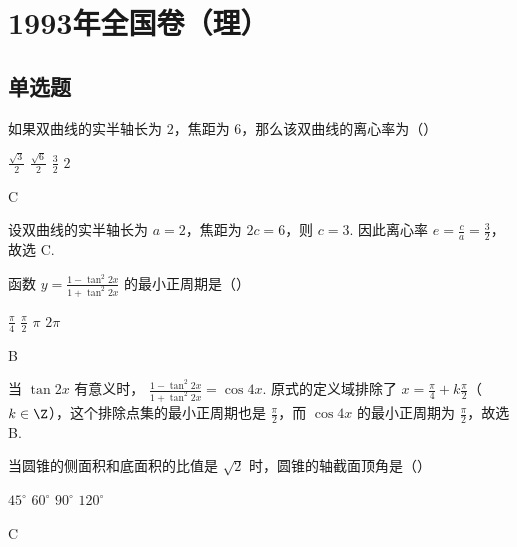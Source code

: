 \chapter{1993年全国卷（理）}
\section{单选题}

\begin{problem}
如果双曲线的实半轴长为 \(2\)，焦距为 \(6\)，那么该双曲线的离心率为（\quad）

\choices
    {\(\frac{\sqrt{3}}{2}\)}
    {\(\frac{\sqrt{6}}{2}\)}
    {\(\frac{3}{2}\)}
    {\(2\)}
\end{problem}

\begin{answer}
C
\end{answer}

\begin{solution}
设双曲线的实半轴长为 \(a=2\)，焦距为 \(2c=6\)，则 \(c=3\). 因此离心率
\(e=\frac{c}{a}=\frac{3}{2}\)，故选 C.
\end{solution}

\begin{problem}
函数 \(y = \frac{1 - \tan^2 2x}{1 + \tan^2 2x} \) 的最小正周期是（\quad）

\choices
    {\(\frac{\pi}{4}\)}
    {\(\frac{\pi}{2}\)}
    {\(\pi\)}
    {\(2\pi\)}
\end{problem}

\begin{answer}
B
\end{answer}

\begin{solution}
当 \(\tan 2x\) 有意义时，
\(\frac{1-\tan^2 2x}{1+\tan^2 2x}=\cos 4x\). 原式的定义域排除了
\(x=\frac{\pi}{4}+k\frac{\pi}{2}\)（\(k\in\Z\)），这个排除点集的最小正周期也是
\(\frac{\pi}{2}\)，而 \(\cos 4x\) 的最小正周期为 \(\frac{\pi}{2}\)，故选 B.
\end{solution}

\begin{problem}
当圆锥的侧面积和底面积的比值是 \(\sqrt{2}\) 时，圆锥的轴截面顶角是（\quad）

\choices
    {\(45^{\circ}\)}
    {\(60^{\circ}\)}
    {\(90^{\circ}\)}
    {\(120^{\circ}\)}
\end{problem}

\begin{answer}
C
\end{answer}

